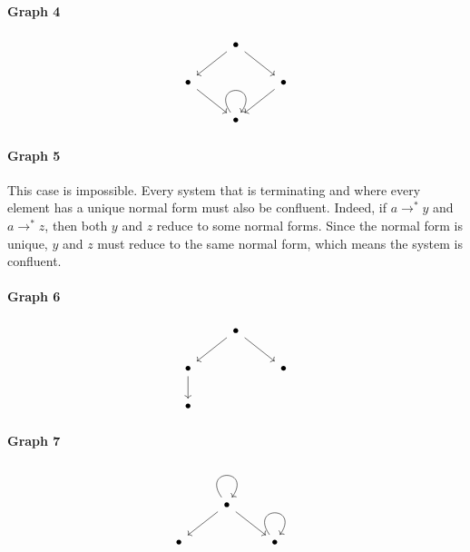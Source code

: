 \documentclass{article}
\theoremstyle{theorem}
\theoremstyle{definition}
\theoremstyle{remark}
\begin{document}
\paragraph{Graph 4}
\[\begin{tikzcd}
	& \bullet \\
	\bullet && \bullet \\
	& \bullet
	\arrow[from=1-2, to=2-1]
	\arrow[from=1-2, to=2-3]
	\arrow[from=2-1, to=3-2]
	\arrow[from=2-3, to=3-2]
	\arrow[from=3-2, to=3-2, loop, in=55, out=125, distance=10mm]
\end{tikzcd}\]

\paragraph{Graph 5}

This case is impossible. Every system that is terminating and where every element has a unique normal form must also be confluent. 
Indeed, if $a \to^* y$ and $a \to^* z$, then both $y$ and $z$ reduce to some normal forms. 
Since the normal form is unique, $y$ and $z$ must reduce to the same normal form, 
which means the system is confluent.


\paragraph{Graph 6}
\[\begin{tikzcd}
	& \bullet \\
	\bullet && \bullet \\
	\bullet
	\arrow[from=1-2, to=2-1]
	\arrow[from=1-2, to=2-3]
	\arrow[from=2-1, to=3-1]
\end{tikzcd}\]

\paragraph{Graph 7}
\[\begin{tikzcd}
	& \bullet \\
	\bullet && \bullet
	\arrow[from=1-2, to=1-2, loop, in=55, out=125, distance=10mm]
	\arrow[from=1-2, to=2-1]
	\arrow[from=1-2, to=2-3]
	\arrow[from=2-3, to=2-3, loop, in=55, out=125, distance=10mm]
\end{tikzcd}\]
\end{document}
